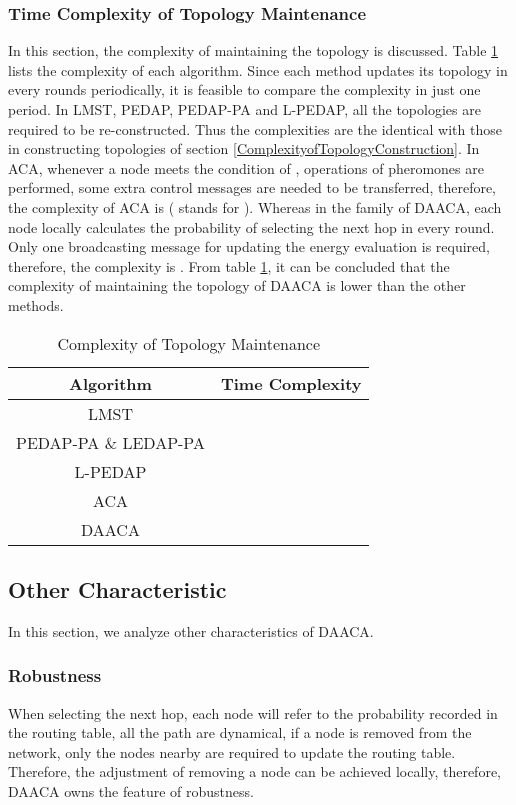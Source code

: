 \documentclass{elsarticle}
\begin{document}
\subsubsection{Time Complexity of Topology Maintenance} \label{ComplexityOfTopologyMaintenance}
In this section, the complexity of maintaining the topology is discussed. Table \ref{ComplexityOfTopologyMaintenanceTable} lists the complexity of each algorithm. Since each method updates its topology in every  rounds periodically, it is feasible to compare the complexity in just one period. In LMST, PEDAP, PEDAP-PA and L-PEDAP, all the topologies are required to be re-constructed. Thus the complexities are the identical with those in constructing topologies of section \ref{ComplexityofTopologyConstruction}. In ACA, whenever a node meets the condition of , operations of pheromones are performed, some extra control messages \cite{label-10} are needed to be transferred, therefore, the complexity of ACA is  ( stands for ). Whereas in the family of DAACA, each node locally calculates the probability of selecting the next hop in every round. Only one broadcasting message for updating the energy evaluation is required, therefore, the complexity is . From table \ref{ComplexityOfTopologyMaintenanceTable}, it can be concluded that the complexity of maintaining the topology of DAACA is lower than the other methods.

\begin{table}[!hbp]
\centering
\caption{Complexity of Topology Maintenance} \label{ComplexityOfTopologyMaintenanceTable}
\begin{tabular}{cc}
\toprule
\textbf{Algorithm} & \textbf{Time Complexity} \\
\midrule
LMST &  \\
PEDAP-PA \& LEDAP-PA &  \\
L-PEDAP &  \\
ACA &  \\
DAACA &  \\
\bottomrule
\end{tabular}

\end{table}


\subsection{Other Characteristic}
In this section, we analyze other characteristics of DAACA.
\subsubsection{Robustness} \label{roubustness}
When selecting the next hop, each node will refer to the probability recorded in the routing table, all the path are dynamical, if a node is removed from the network, only the nodes nearby are required to update the routing table. Therefore, the adjustment of removing a node can be achieved locally, therefore, DAACA owns the feature of robustness.
\end{document}
